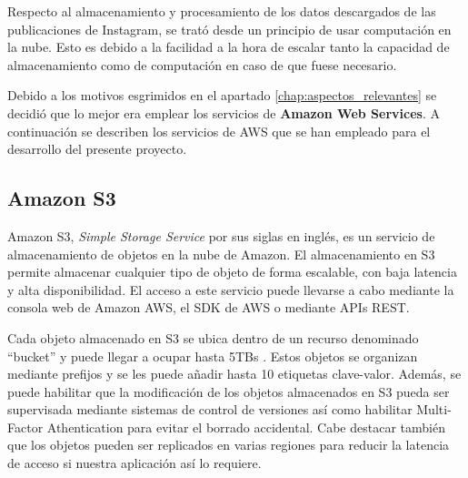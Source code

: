 Respecto al almacenamiento y procesamiento de los datos descargados de las publicaciones de Instagram, se trató desde un principio de usar computación en la nube. Esto es debido a la facilidad a la hora de escalar tanto la capacidad de almacenamiento como de computación en caso de que fuese necesario.

Debido a los motivos esgrimidos en el apartado \autoref{chap:aspectos_relevantes} se decidió que lo mejor era emplear los servicios de \textbf{Amazon Web Services}. A continuación se describen los servicios de AWS que se han empleado para el desarrollo del presente proyecto.

\subsection{Amazon S3}
Amazon S3, \textit{Simple Storage Service} por sus siglas en inglés, es un servicio de almacenamiento de objetos en la nube de Amazon. El almacenamiento en S3 permite almacenar cualquier tipo de objeto de forma escalable, con baja latencia y alta disponibilidad. El acceso a este servicio puede llevarse a cabo mediante la consola web de Amazon AWS, el SDK de AWS o mediante APIs REST.

Cada objeto almacenado en S3 se ubica dentro de un recurso denominado ``bucket'' y puede llegar a ocupar hasta 5TBs \cite{amazon_s3}. Estos objetos se organizan mediante prefijos y se les puede añadir hasta 10 etiquetas clave-valor. Además, se puede habilitar que la modificación de los objetos almacenados en S3 pueda ser supervisada mediante sistemas de control de versiones así como habilitar Multi-Factor Athentication para evitar el borrado accidental. Cabe destacar también que los objetos pueden ser replicados en varias regiones para reducir la latencia de acceso si nuestra aplicación así lo requiere.

